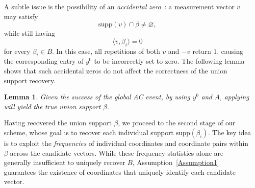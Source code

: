 \documentclass[10pt,a4paper]{amsart}
\newcommand{\xl}[1]{{\color{blue}#1}}
\newtheorem{lemma}{Lemma}[section]
\newcommand{\supp}{\mathrm{supp}}
\begin{document}
A subtle issue is the possibility of an \emph{accidental zero}~\cite{li2025support}: a measurement vector $v$ may satisfy
\[
\supp(v)\cap\beta\neq\varnothing,
\]
while still having
\[
\langle v,\beta_i\rangle=0
\]
for every $\beta_i\in B$. In this case, all repetitions of both $v$ and $-v$ return $1$, causing the corresponding entry of $y^0$ to be incorrectly set to zero. The following lemma shows that such accidental zeros do not affect the correctness of the union support recovery.

\begin{lemma}\label{lem:trueb}
    Given the success of the global AC event, by using $y^0$ and $A$, applying \cite[Algorithm~3]{li2025support} will yield the true union support $\beta$. 
\end{lemma}


Having recovered the union support $\beta$, we proceed to the second stage of our scheme, whose goal is to recover each individual support $\supp(\beta_i)$. The key idea is to exploit the \emph{frequencies} of individual coordinates and coordinate pairs within $\beta$ across the candidate vectors. While these frequency statistics alone are generally insufficient to uniquely recover $B$, Assumption~\ref{Assumption1} guarantees the existence of coordinates that uniquely identify each candidate vector. 
\end{document}
